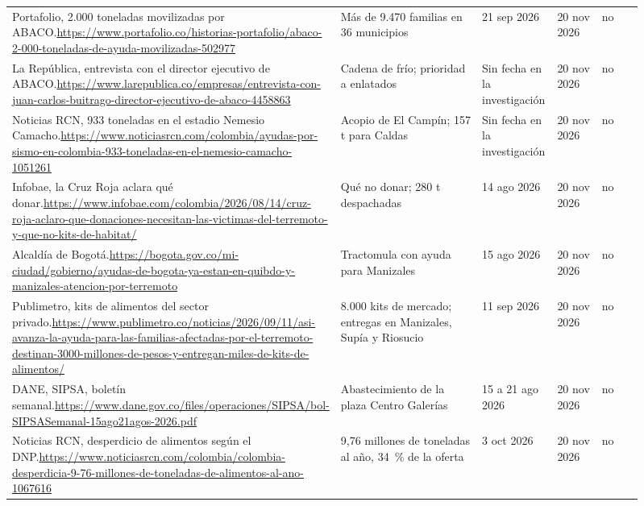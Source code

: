 {\begin{longtable}{L{0.35\linewidth} L{0.27\linewidth} L{0.12\linewidth} L{0.085\linewidth} L{0.085\linewidth}}
Portafolio, 2.000 toneladas movilizadas por ABACO.\newline \url{https://www.portafolio.co/historias-portafolio/abaco-2-000-toneladas-de-ayuda-movilizadas-502977} & Más de 9.470 familias en 36 municipios & 21 sep 2026 & 20 nov 2026 & no\\
La República, entrevista con el director ejecutivo de ABACO.\newline \url{https://www.larepublica.co/empresas/entrevista-con-juan-carlos-buitrago-director-ejecutivo-de-abaco-4458863} & Cadena de frío; prioridad a enlatados & Sin fecha en la investigación & 20 nov 2026 & no\\
Noticias RCN, 933 toneladas en el estadio Nemesio Camacho.\newline \url{https://www.noticiasrcn.com/colombia/ayudas-por-sismo-en-colombia-933-toneladas-en-el-nemesio-camacho-1051261} & Acopio de El Campín; 157 t para Caldas & Sin fecha en la investigación & 20 nov 2026 & no\\
Infobae, la Cruz Roja aclara qué donar.\newline \url{https://www.infobae.com/colombia/2026/08/14/cruz-roja-aclaro-que-donaciones-necesitan-las-victimas-del-terremoto-y-que-no-kits-de-habitat/} & Qué no donar; 280 t despachadas & 14 ago 2026 & 20 nov 2026 & no\\
Alcaldía de Bogotá.\newline \url{https://bogota.gov.co/mi-ciudad/gobierno/ayudas-de-bogota-ya-estan-en-quibdo-y-manizales-atencion-por-terremoto} & Tractomula con ayuda para Manizales & 15 ago 2026 & 20 nov 2026 & no\\
Publimetro, kits de alimentos del sector privado.\newline \url{https://www.publimetro.co/noticias/2026/09/11/asi-avanza-la-ayuda-para-las-familias-afectadas-por-el-terremoto-destinan-3000-millones-de-pesos-y-entregan-miles-de-kits-de-alimentos/} & 8.000 kits de mercado; entregas en Manizales, Supía y Riosucio & 11 sep 2026 & 20 nov 2026 & no\\
DANE, SIPSA, boletín semanal.\newline \url{https://www.dane.gov.co/files/operaciones/SIPSA/bol-SIPSASemanal-15ago21agos-2026.pdf} & Abastecimiento de la plaza Centro Galerías & 15 a 21 ago 2026 & 20 nov 2026 & no\\
Noticias RCN, desperdicio de alimentos según el DNP.\newline \url{https://www.noticiasrcn.com/colombia/colombia-desperdicia-9-76-millones-de-toneladas-de-alimentos-al-ano-1067616} & 9,76 millones de toneladas al año, 34~\% de la oferta & 3 oct 2026 & 20 nov 2026 & no\\

\end{longtable}}
